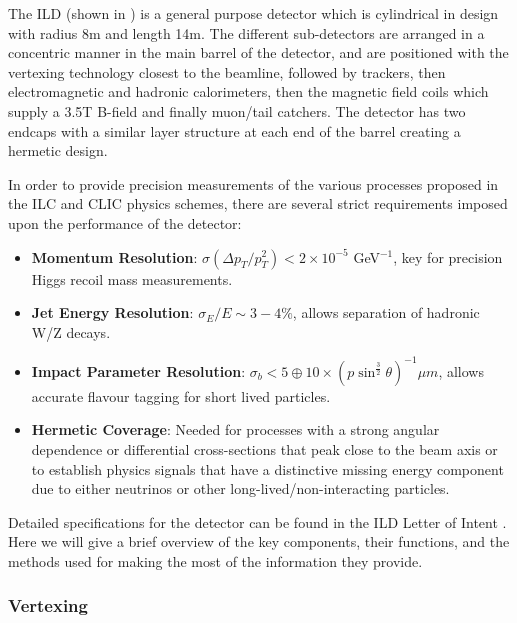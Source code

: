 The ILD (shown in ) is a general purpose detector which is cylindrical in design with radius 8m and length 14m. The different sub-detectors are arranged in a concentric manner in the main barrel of the detector, and are positioned with the vertexing technology closest to the beamline, followed by trackers, then electromagnetic and hadronic calorimeters, then the magnetic field coils which supply a 3.5T B-field and finally muon/tail catchers. The detector has two endcaps with a similar layer structure at each end of the barrel creating a hermetic design.

In order to provide precision measurements of the various processes proposed in the \ac{ILC} and \ac{CLIC} physics schemes, there are several strict requirements imposed upon the performance of the detector:

\begin{itemize}

\item \textbf{Momentum Resolution}: $\sigma(\Delta p_T/ p_{T}^2) < 2 \times 10^{-5}$ GeV$^{-1}$, key for precision Higgs recoil mass measurements.

\item \textbf{Jet Energy Resolution}: $\sigma_E/E \sim 3-4\%$, allows separation of hadronic W/Z decays.

\item \textbf{Impact Parameter Resolution}: $\sigma_{b} < 5 \oplus 10 \times (p\sin^{\frac{3}{2}}\theta)^{-1}\mu m$, allows accurate flavour tagging for short lived particles.

\item \textbf{Hermetic Coverage}: Needed for processes with a strong angular dependence or differential cross-sections that peak close to the beam axis or to establish physics signals that have a distinctive missing energy component due to either neutrinos or other long-lived/non-interacting particles.

\end{itemize}

Detailed specifications for the detector can be found in the \ac{ILD} Letter of Intent \cite{ILD}. Here we will give a brief overview of the key components, their functions, and the methods used for making the most of the information they provide.

\subsubsection{Vertexing}

